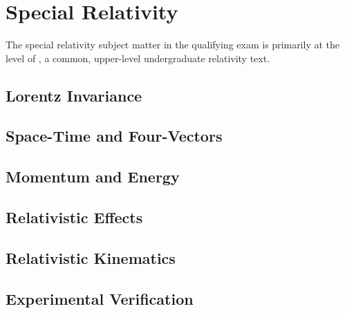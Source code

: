 \newpage
\chapter{Special Relativity}
\label{sec:specrel}
The special relativity subject matter in the qualifying exam is primarily at the level of \cite{ohanianModernPhysics1995}, a common, upper-level undergraduate relativity text.


\section{Lorentz Invariance}
\section{Space-Time and Four-Vectors}
\section{Momentum and Energy}
\section{Relativistic Effects}
\section{Relativistic Kinematics}
\section{Experimental Verification}
